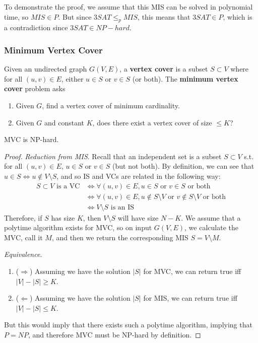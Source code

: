 \begin{example}
      To demonstrate the proof, we assume that this MIS can be solved in polynomial time, so $MIS \in P$. But since $3SAT \leq_p MIS$, this means that $3SAT \in P$, which is a contradiction since $3SAT \in NP-hard$. 
    \end{example} 

  \subsubsection{Minimum Vertex Cover}

    \begin{definition}
      Given an undirected graph $G(V, E)$, a \textbf{vertex cover} is a subset $S \subset V$ where for all $(u, v) \in E$, either $u \in S$ or $v \in S$ (or both). The \textbf{minimum vertex cover} problem asks 
      \begin{enumerate}
        \item Given $G$, find a vertex cover of minimum cardinality. 
        \item Given $G$ and constant $K$, does there exist a vertex cover of size $\leq K$? 
      \end{enumerate}
    \end{definition}

    \begin{theorem}[MVC]
      MVC is NP-hard. 
    \end{theorem}
    \begin{proof}
      \textit{Reduction from MIS}. Recall that an independent set is a subset $S \subset V$ s.t. for all $(u, v) \in E$, $u \in S$ or $v \in S$ (but not both). By definition, we can see that $u \in S \iff u \not\in V \setminus S$, and so IS and VCs are related in the following way: 
      \begin{align}
        S \subset V \text{ is a VC} & \iff \forall (u, v) \in E, u \in S \text{ or } v \in S \text{ or both} \\
                                    & \iff \forall (u, v) \in E, u \not\in S \setminus V \text{ or } v \not\in S \setminus V \text{ or both} \\
                                    & \iff V \setminus S \text{ is an IS}
      \end{align}
      Therefore, if $S$ has size $K$, then $V \setminus S$ will have size $N - K$. We assume that a polytime algorithm exists for MVC, so on input $G(V, E)$, we calculate the MVC, call it $M$, and then we return the corresponding MIS $S = V \setminus M$. 

      \textit{Equivalence}. 
      \begin{enumerate}
        \item ($\Rightarrow$) Assuming we have the solution $|S|$ for MVC, we can return true iff $|V| - |S| \geq K$. 
        \item ($\Leftarrow$) Assuming we have the solution $|S|$ for MIS, we can return true iff $|V| - |S| \leq K$. 
      \end{enumerate}
      But this would imply that there exists such a polytime algorithm, implying that $P = NP$, and therefore MVC must be NP-hard by definition. 
    \end{proof}

